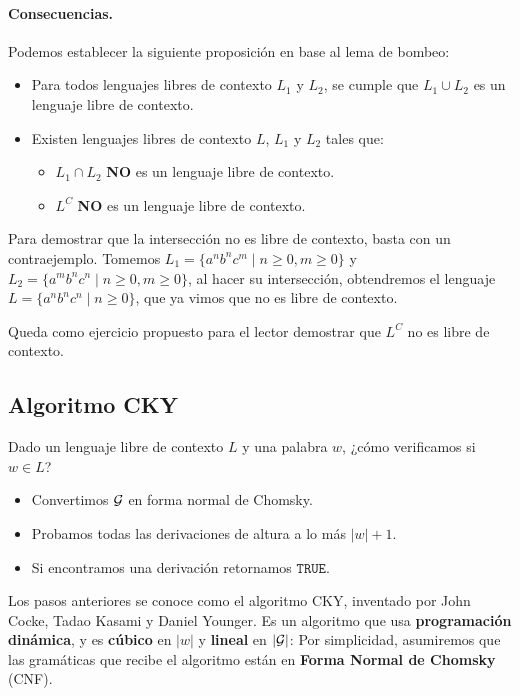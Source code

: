 \paragraph{Consecuencias.} Podemos establecer la siguiente proposición en base al lema de bombeo:
\begin{itemize}
    \item Para todos lenguajes libres de contexto $L_1$ y $L_2$, se cumple que $L_1 \cup L_2$ es un lenguaje libre de contexto.
    \item Existen lenguajes libres de contexto $L$, $L_1$ y $L_2$ tales que:
          \begin{itemize}
              \item $L_1 \cap L_2$ \textbf{NO} es un lenguaje libre de contexto.
              \item $L^C$ \textbf{NO} es un lenguaje libre de contexto.
          \end{itemize}
\end{itemize}

Para demostrar que la intersección no es libre de contexto, basta con un contraejemplo. Tomemos $L_1 = \{a^n b^n c^m \mid n\geq 0, m \geq 0\}$ y $L_2 = \{a^m b^n c^n \mid n \geq 0, m \geq 0\}$, al hacer su intersección, obtendremos el lenguaje $L = \{a^n b^n c^n \mid n \geq 0\}$, que ya vimos que no es libre de contexto. \medbreak

Queda como ejercicio propuesto para el lector demostrar que $L^C$ no es libre de contexto.

\subsection{Algoritmo CKY}

Dado un lenguaje libre de contexto $L$ y una palabra $w$, ¿cómo verificamos si $w \in L$?
\begin{itemize}
    \item Convertimos $\mathcal{G}$ en forma normal de Chomsky.
    \item Probamos todas las derivaciones de altura a lo más $|w| + 1$.
    \item Si encontramos una derivación retornamos $\texttt{TRUE}$.
\end{itemize}

Los pasos anteriores se conoce como el algoritmo CKY, inventado por John Cocke, Tadao Kasami y Daniel Younger. Es un algoritmo que usa \textbf{programación dinámica}, y es \textbf{cúbico} en $|w|$ y \textbf{lineal} en $|\mathcal{G}|$:
Por simplicidad, asumiremos que las gramáticas que recibe el algoritmo están en \textbf{Forma Normal de Chomsky} (CNF).

